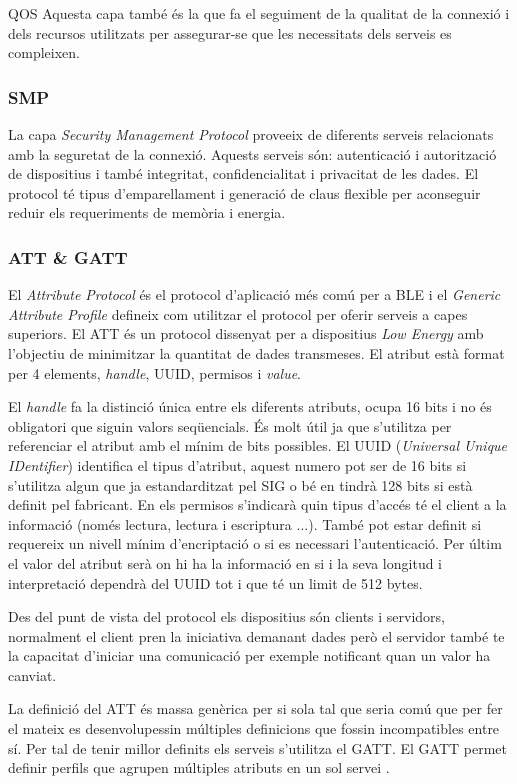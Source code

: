 QOS Aquesta capa també és la que fa el seguiment de la qualitat de la connexió i dels recursos utilitzats per assegurar-se que les necessitats dels serveis es compleixen.

\subsubsection{SMP}
La capa \textit{Security Management Protocol} proveeix de diferents serveis relacionats amb la seguretat de la connexió.
Aquests serveis són: autenticació i autorització de dispositius i també integritat, confidencialitat i privacitat de les dades.
El protocol té tipus d'emparellament i generació de claus flexible per aconseguir reduir els requeriments de memòria i energia.

\subsubsection{ATT \& GATT}
El \textit{Attribute Protocol} és el protocol d'aplicació més comú per a BLE i el \textit{Generic Attribute Profile} defineix com utilitzar el protocol per oferir serveis a capes superiors.
El ATT és un protocol dissenyat per a dispositius \textit{Low Energy} amb l'objectiu de minimitzar la quantitat de dades transmeses. El atribut està format per 4 elements, \textit{handle}, UUID, permisos  i \textit{value}.

El \textit{handle} fa la distinció única entre els diferents atributs, ocupa 16 bits i no és obligatori que siguin valors seqüencials. És molt útil ja que s'utilitza per referenciar el atribut amb el mínim de bits possibles.
El UUID (\textit{Universal Unique IDentifier}) identifica el tipus d'atribut, aquest numero pot ser de 16 bits si s'utilitza algun que ja estandarditzat pel SIG o bé en tindrà 128 bits si està definit pel fabricant.
En els permisos s'indicarà quin tipus d'accés té el client a la informació (només lectura, lectura i escriptura ...). També pot estar definit si requereix un nivell mínim d'encriptació o si es necessari l'autenticació.
Per últim el valor del atribut serà on hi ha la informació en si i la seva longitud i interpretació dependrà del UUID tot i que té un limit de 512 bytes.

Des del punt de vista del protocol els dispositius són clients i servidors, normalment el client pren la iniciativa demanant dades però el servidor també te la capacitat d'iniciar una comunicació per exemple notificant quan un valor ha canviat.

La definició del ATT és massa genèrica per si sola tal que seria comú que per fer el mateix es desenvolupessin múltiples definicions que fossin incompatibles entre sí.
Per tal de tenir millor definits els serveis s'utilitza el GATT. El GATT permet definir perfils que agrupen múltiples atributs en un sol servei \cite{services}.

